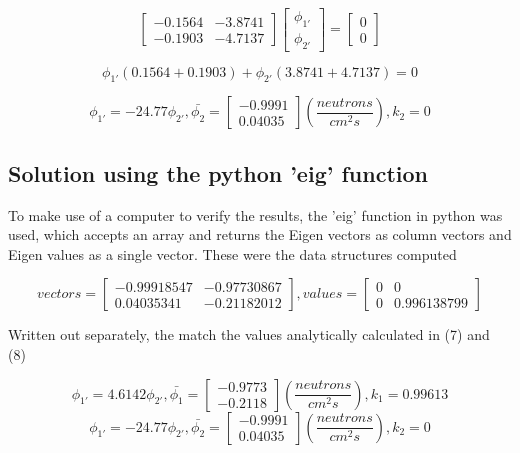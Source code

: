 \documentclass[11pt, oneside]{article}   	%
\begin{document}
$$\begin{bmatrix}
-0.1564&-3.8741 \\ 
-0.1903 & -4.7137
\end{bmatrix} \begin{bmatrix}
\phi _{1'}\\ 
\phi _{2'}
\end{bmatrix}= \begin{bmatrix}
0\\ 
0
\end{bmatrix}$$

$$\phi _{1'}(0.1564+0.1903)+\phi _{2'}(3.8741+4.7137) = 0$$

\begin{equation}
\phi _{1'}=-24.77\phi_{2'}, \bar{\phi _{2}} = \begin{bmatrix}
-0.9991\\ 
0.04035
\end{bmatrix}(\frac{neutrons}{cm^{2}s}), k_{2} = 0 \end{equation}

\subsection{Solution using the python 'eig' function}

To make use of a computer to verify the results, the 'eig' function in python was used, which accepts an array and returns the Eigen vectors as column vectors and Eigen values as a single vector. These were the data structures computed

$$vectors = \begin{bmatrix}
 -0.99918547& -0.97730867\\ 
 0.04035341&-0.21182012 
\end{bmatrix}, values = \begin{bmatrix}
 0&0 \\ 
 0& 0.996138799
\end{bmatrix}$$

Written out separately, the match the values analytically calculated in (7) and (8)

$$\phi _{1'}=4.6142\phi_{2'}, \bar{\phi _{1}} = \begin{bmatrix}
-0.9773\\ 
-0.2118
\end{bmatrix}(\frac{neutrons}{cm^{2}s}), k_{1} = 0.99613 $$
$$
\phi _{1'}=-24.77\phi_{2'}, \bar{\phi _{2}} = \begin{bmatrix}
-0.9991\\ 
0.04035
\end{bmatrix}(\frac{neutrons}{cm^{2}s}), k_{2} = 0 
$$
\end{document}
